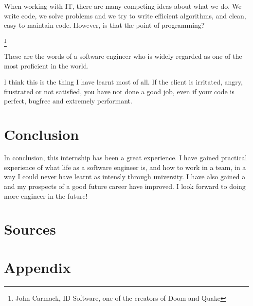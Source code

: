 \documentclass[../main.tex]{subfiles}
\begin{document}
When working with IT, there are many competing ideas about what we do. We write
code, we solve problems and we try to write efficient algorithms, and clean, easy to maintain code. However, is that the point of programming? 

\footnote{John Carmack, ID Software, one of the creators of Doom and Quake}

These are the words of a software engineer who is  widely regarded as one of the most proficient in the world.

I think this is the thing I have learnt most of all. If the client is irritated, angry, frustrated or not satisfied, you have not done a good job, even if your code is perfect, bugfree and extremely performant.  


\section{Conclusion}
\label{sec:conclusion}

In conclusion, this internship has been a great experience. I have gained practical experience of what life as a software engineer is, and how to work in a team, in a way I could never have learnt as intensly through university. I have also gained a  and my prospects of a good future career have improved. I look forward to doing more engineer in the future!


\section{Sources}
\label{sec:sources}

\section{Appendix}
\label{sec:appendix}
\end{document}
